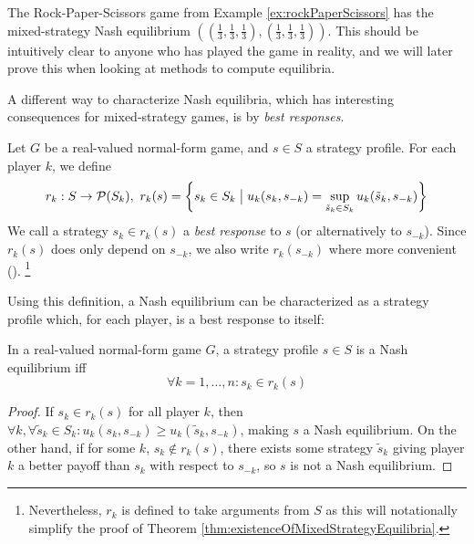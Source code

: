 \documentclass[a4paper]{scrreprt}
\begin{document}
    \begin{ex} %
        The Rock-Paper-Scissors game from Example \ref{ex:rockPaperScissors}
        has the mixed-strategy Nash equilibrium $((\frac{1}{3}, \frac{1}{3}, \frac{1}{3}), (\frac{1}{3}, \frac{1}{3}, \frac{1}{3}))$.
        This should be intuitively clear to anyone who has played the game in reality, and we will later prove this when looking at methods to compute equilibria.
    \end{ex}
    
    A different way to characterize Nash equilibria, which has interesting consequences for mixed-strategy games, is by \emph{best responses}.
    
    \begin{defn}
        Let $G$ be a real-valued normal-form game, and $s \in S$ a strategy profile. For each player $k$, we define 
        \[
            r_k: S \to \operatorname{\mathcal{P}}(S_k),~ r_k(s) = \biggl\{s_k \in S_k \bigm\vert u_k(s_k, s_{-k}) = \sup_{\tilde{s}_k \in S_k} u_k(\tilde{s}_k, s_{-k}) \biggr\}
        \]
        We call a strategy $s_k \in r_k(s)$ a \emph{best response} to $s$ (or alternatively to $s_{-k}$).
        Since $r_k(s)$ does only depend on $s_{-k}$, we also write $r_k(s_{-k})$ where more convenient (\cite{bib:fudenbergGameTheory}).
        \footnote{Nevertheless, $r_k$ is defined to take arguments from $S$ as this will notationally simplify the proof of Theorem \ref{thm:existenceOfMixedStrategyEquilibria}.}
    \end{defn}
%    
    Using this definition, a Nash equilibrium can be characterized as a strategy profile which, for each player, is a best response to itself:
%    
    \begin{thm}
        In a real-valued normal-form game $G$, a strategy profile $s \in S$ is a Nash equilibrium iff 
        \[
            \forall k = 1, \dots, n: s_k \in r_k(s)
        \]\label{thm:nashEquilibriumCharacterizationByBestResponses}
    \end{thm}
    \begin{proof}
        If $s_k \in r_k(s)$ for all player $k$, then $\forall k, \forall \tilde{s}_k \in S_k: u_k(s_k, s_{-k}) \geq u_k(\tilde{s}_k, s_{-k})$, making $s$ a Nash equilibrium.
        On the other hand, if for some $k$, $s_k \notin r_k(s)$, there exists some strategy $\tilde{s}_k$ giving player $k$ a better payoff than $s_k$ with respect to $s_{-k}$, so $s$ is not a Nash equilibrium.
    \end{proof}
\end{document}
